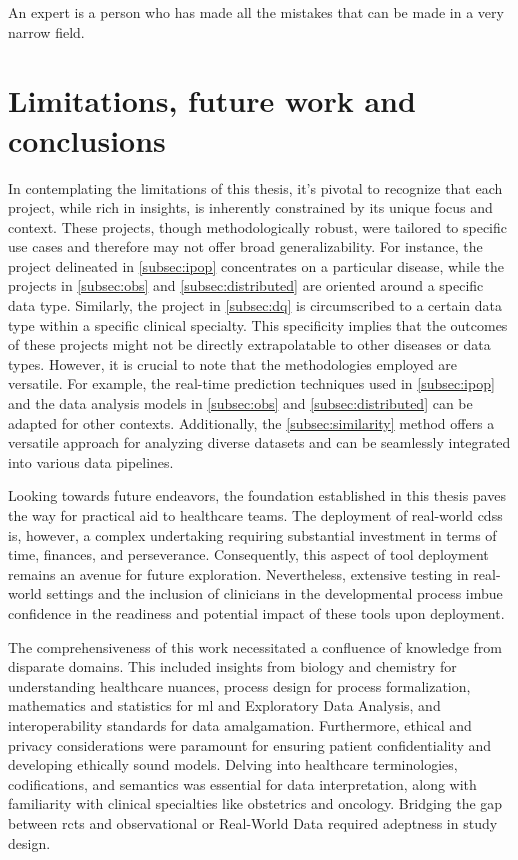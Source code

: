 \begin{savequote}[75mm]
An expert is a person who has made all the mistakes that can be made in a very narrow field.
\end{savequote}
\chapter{Limitations, future work and conclusions} \label{chap:conclusion}

In contemplating the limitations of this thesis, it's pivotal to recognize that each project, while rich in insights, is inherently constrained by its unique focus and context. These projects, though methodologically robust, were tailored to specific use cases and therefore may not offer broad generalizability. For instance, the project delineated in \ref{subsec:ipop} concentrates on a particular disease, while the projects in \ref{subsec:obs} and \ref{subsec:distributed} are oriented around a specific data type. Similarly, the project in \ref{subsec:dq} is circumscribed to a certain data type within a specific clinical specialty. This specificity implies that the outcomes of these projects might not be directly extrapolatable to other diseases or data types. However, it is crucial to note that the methodologies employed are versatile. For example, the real-time prediction techniques used in \ref{subsec:ipop} and the data analysis models in \ref{subsec:obs} and \ref{subsec:distributed} can be adapted for other contexts. Additionally, the \ref{subsec:similarity} method offers a versatile approach for analyzing diverse datasets and can be seamlessly integrated into various data pipelines.

Looking towards future endeavors, the foundation established in this thesis paves the way for practical aid to healthcare teams. The deployment of real-world \ac{cdss} is, however, a complex undertaking requiring substantial investment in terms of time, finances, and perseverance. Consequently, this aspect of tool deployment remains an avenue for future exploration. Nevertheless, extensive testing in real-world settings and the inclusion of clinicians in the developmental process imbue confidence in the readiness and potential impact of these tools upon deployment.


The comprehensiveness of this work necessitated a confluence of knowledge from disparate domains. This included insights from biology and chemistry for understanding healthcare nuances, process design for process formalization, mathematics and statistics for \ac{ml} and Exploratory Data Analysis, and interoperability standards for data amalgamation. Furthermore, ethical and privacy considerations were paramount for ensuring patient confidentiality and developing ethically sound models. Delving into healthcare terminologies, codifications, and semantics was essential for data interpretation, along with familiarity with clinical specialties like obstetrics and oncology. Bridging the gap between \acp{rct} and observational or Real-World Data required adeptness in study design.

